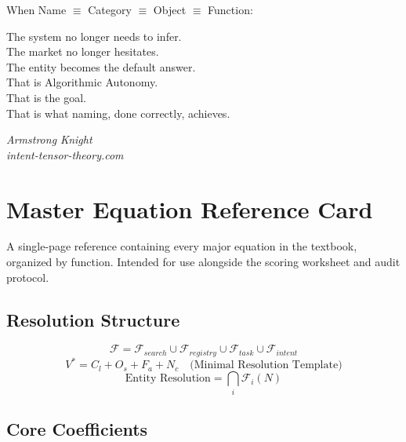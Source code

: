 \documentclass[12pt, openany]{book}
\theoremstyle{thmstyle}
\theoremstyle{defstyle}
\begin{document}
\begin{conclusionbox}
When Name $\equiv$ Category $\equiv$ Object $\equiv$ Function:

\vspace{6pt}
The system no longer needs to infer.\\
The market no longer hesitates.\\
The entity becomes the default answer.\\

\vspace{6pt}
That is Algorithmic Autonomy.\\
That is the goal.\\
That is what naming, done correctly, achieves.

\vspace{6pt}
\begin{flushright}
\textit{Armstrong Knight}\\
\textit{intent-tensor-theory.com}
\end{flushright}
\end{conclusionbox}

\appendix
\chapter{Master Equation Reference Card}

\begin{appbox}[Purpose]
A single-page reference containing every major equation in the textbook, organized by function. Intended for use alongside the scoring worksheet and audit protocol.
\end{appbox}

\section*{Resolution Structure}

\[
\mathcal{F} = \mathcal{F}_{search} \cup \mathcal{F}_{registry} \cup \mathcal{F}_{task} \cup \mathcal{F}_{intent}
\]
\[
V^* = C_l + O_s + F_a + N_c \quad \text{(Minimal Resolution Template)}
\]
\[
\text{Entity Resolution} = \bigcap_i \mathcal{F}_i(N)
\]

\section*{Core Coefficients}
\end{document}
